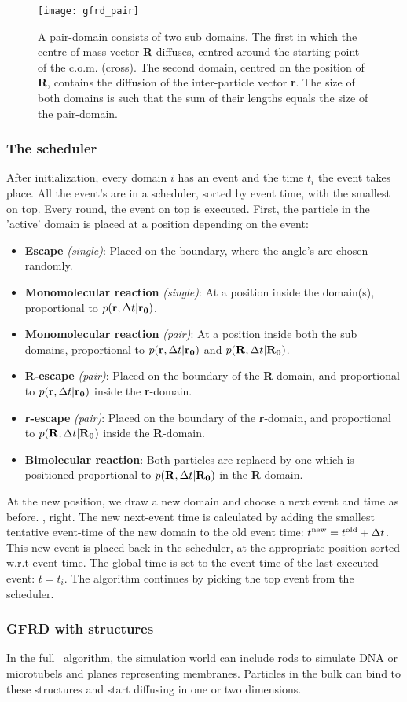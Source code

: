 \begin{figure}[ht]
\centering
\texttt{[image: gfrd\_pair]}
\caption{ A pair-domain consists of two sub domains. The first in which the centre of mass vector {\bf R} diffuses, centred around the starting point of the c.o.m. (cross). The second domain, centred on the position of {\bf R}, contains the diffusion of the inter-particle vector {\bf r}. The size of both domains is such that the sum of their lengths equals the size of the pair-domain. }
\end{figure}

\subsubsection{The scheduler}
After initialization, every domain $i$ has an event and the time $t_i$ the event takes place. All the event's are in a scheduler, sorted by event time, with the smallest on top. Every round, the event on top is executed. First, the particle in the 'active' domain is placed at a position depending on the event: 
\begin{itemize}
 \item {\bf Escape} {\it (single)}: Placed on the boundary, where the angle's are chosen randomly.
 \item {\bf Monomolecular reaction} {\it (single)}: At a position inside the domain(s), proportional to $p({\bf r},\Delta t|{\bf r_0})$.
 \item {\bf Monomolecular reaction} {\it (pair)}: At a position inside both the sub domains, proportional to $p({\bf r},\Delta t|{\bf r_0})$ and $p({\bf R},\Delta t|{\bf R_0})$.
 \item {\bf R-escape} {\it (pair)}: Placed on the boundary of the {\bf R}-domain, and proportional to $p({\bf r},\Delta t|{\bf r_0})$ inside the {\bf r}-domain.
 \item {\bf r-escape} {\it (pair)}: Placed on the boundary of the {\bf r}-domain, and proportional to $p({\bf R},\Delta t|{\bf R_0})$ inside the {\bf R}-domain. 
 \item {\bf Bimolecular reaction}: Both particles are replaced by one which is positioned proportional to $p({\bf R},\Delta t|{\bf R_0})$ in the {\bf R}-domain.
\end{itemize}
At the new position, we draw a new domain and choose a next event and time as before. , right. The new next-event time is calculated by adding the smallest tentative event-time of the new domain to the old event time: $t^{\rm new} =  t^{\rm old} + \Delta t$. This new event is placed back in the scheduler, at the appropriate position sorted w.r.t event-time. The global time is set to the event-time of the last executed event: $t=t_i$. The algorithm continues by picking the top event from the scheduler.

\subsubsection{GFRD with structures}
In the full \GFRD\ algorithm, the simulation world can include rods to simulate DNA or microtubels and planes representing membranes. Particles in the bulk can bind to these structures and start diffusing in one or two dimensions.










